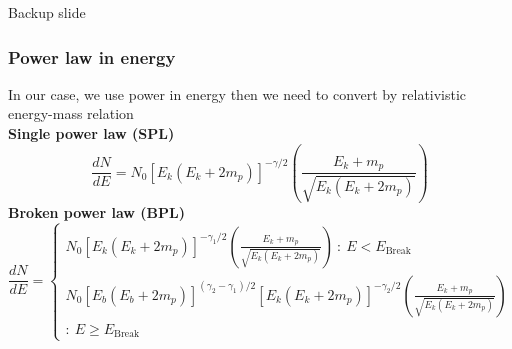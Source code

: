 \documentclass{beamer}
\begin{document}

\begin{frame}
\Huge{\centerline{Backup slide}}
\end{frame}

\begin{frame}
\frametitle{Power law in energy}
In our case, we use power in energy then we need to convert by relativistic energy-mass relation \\
\textbf{Single power law (SPL)}
\begin{equation}
\frac{dN}{dE} = N_0[E_k(E_k+2m_p)]^{-\gamma/2} \left(\frac{E_k+m_p}{\sqrt{E_k(E_k+2m_p)}}\right)
\end{equation}
\textbf{Broken power law (BPL)}
\begin{equation}
\frac{dN}{dE}=
  \begin{cases}
    N_0[E_k(E_k+2m_p)]^{-\gamma_1/2} \left(\frac{E_k+m_p}{\sqrt{E_k(E_k+2m_p)}}\right)\ :\ E < E_{\text{Break}}\\
    N_0[E_b(E_b+2m_p)]^{(\gamma_2-\gamma_1)/2}[E_k(E_k+2m_p)]^{-\gamma_2/2} \left(\frac{E_k+m_p}{\sqrt{E_k(E_k+2m_p)}}\right)\\ :\ E \ge E_{\text{Break}}
  \end{cases}
\end{equation}
\end{frame}
\end{document}
